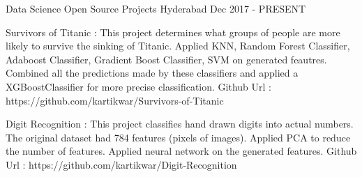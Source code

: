 \begin{cventries}


  \cventry
    {Data Science} %
    {Open Source Projects} %
    {Hyderabad} %
    {Dec 2017 - PRESENT} %
    {
      \begin{cvitems} %
        \item {Survivors of Titanic : This project determines what groups of people are more likely to survive the sinking of Titanic. Applied KNN, Random Forest Classifier, Adaboost Classifier, Gradient Boost Classifier, SVM on generated feautres. Combined all the predictions made by these classifiers and applied a XGBoostClassifier for more precise classification. Github Url : https://github.com/kartikwar/Survivors-of-Titanic}
        \item {Digit Recognition :  This project classifies hand drawn digits into actual numbers. The original dataset had 784 features (pixels of images). Applied PCA to reduce the number of features. Applied neural network on the generated features. Github Url : https://github.com/kartikwar/Digit-Recognition}      
	\end{cvitems}
    }
\end{cventries}
